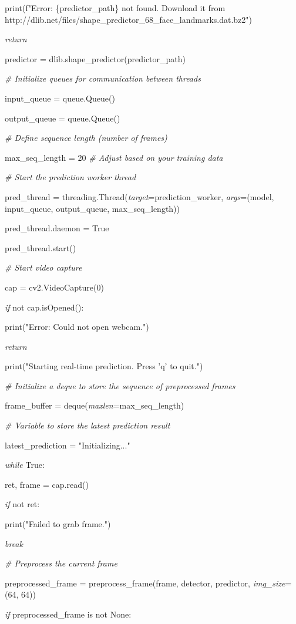 \documentclass[
]{article}
\begin{document}
print(f"Error: \{predictor\_path\} not found. Download it from http://dlib.net/files/shape\_predictor\_68\_face\_landmarks.dat.bz2")

\emph{return}

predictor = dlib.shape\_predictor(predictor\_path)

\emph{\# Initialize queues for communication between threads}

input\_queue = queue.Queue()

output\_queue = queue.Queue()

\emph{\# Define sequence length (number of frames)}

max\_seq\_length = 20 \emph{\# Adjust based on your training data}

\emph{\# Start the prediction worker thread}

pred\_thread = threading.Thread(\emph{target}=prediction\_worker, \emph{args}=(model, input\_queue, output\_queue, max\_seq\_length))

pred\_thread.daemon = True

pred\_thread.start()

\emph{\# Start video capture}

cap = cv2.VideoCapture(0)

\emph{if} not cap.isOpened():

print("Error: Could not open webcam.")

\emph{return}

print("Starting real-time prediction. Press 'q' to quit.")

\emph{\# Initialize a deque to store the sequence of preprocessed frames}

frame\_buffer = deque(\emph{maxlen}=max\_seq\_length)

\emph{\# Variable to store the latest prediction result}

latest\_prediction = "Initializing..."

\emph{while} True:

ret, frame = cap.read()

\emph{if} not ret:

print("Failed to grab frame.")

\emph{break}

\emph{\# Preprocess the current frame}

preprocessed\_frame = preprocess\_frame(frame, detector, predictor, \emph{img\_size}=(64, 64))

\emph{if} preprocessed\_frame is not None:
\end{document}
